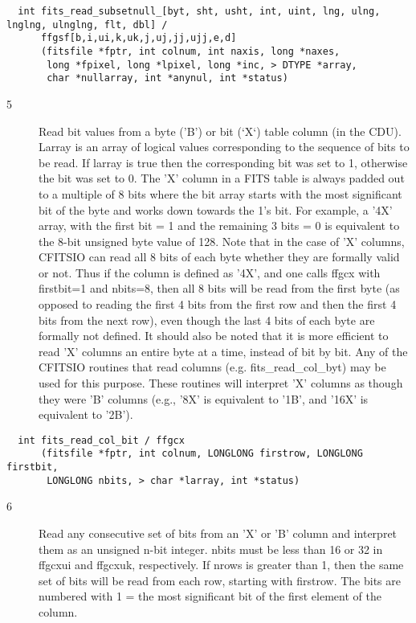 \documentclass[11pt]{book}
\begin{document}
\begin{verbatim}
  int fits_read_subsetnull_[byt, sht, usht, int, uint, lng, ulng, lnglng, ulnglng, flt, dbl] /
      ffgsf[b,i,ui,k,uk,j,uj,jj,ujj,e,d]
      (fitsfile *fptr, int colnum, int naxis, long *naxes,
       long *fpixel, long *lpixel, long *inc, > DTYPE *array,
       char *nullarray, int *anynul, int *status)
\end{verbatim}

\begin{description}
\item[5 ] Read bit values from a byte ('B') or bit (`X`) table column (in the
    CDU).  Larray is an array of logical values corresponding to the
    sequence of bits to be read.  If larray is true then the
    corresponding bit was set to 1, otherwise the bit was set to 0.
    The 'X' column in a FITS table is always padded out to a multiple
    of 8 bits where the bit array starts with the most significant bit
    of the byte and works down towards the 1's bit.  For example, a
    '4X' array, with the first bit = 1 and the remaining 3 bits = 0 is
    equivalent to the 8-bit unsigned byte value of 128.
    Note that in the case of 'X' columns, CFITSIO can read  all 8 bits
    of each byte whether they are formally valid or not.  Thus if the
    column is defined as '4X', and one calls ffgcx with  firstbit=1 and
    nbits=8, then all 8 bits will be read from the first byte (as
    opposed to reading the first 4 bits from the first row and then the
    first 4 bits from the next row), even though the last 4 bits of
    each byte are formally not defined.  It should also be noted that
    it is more efficient to read 'X' columns an entire byte at a time,
    instead of bit by bit.  Any of the CFITSIO routines that read
    columns (e.g. fits\_read\_col\_byt) may be used for this
    purpose.  These routines will interpret 'X' columns as though they
    were 'B' columns (e.g.,  '8X' is equivalent to '1B', and '16X' is
   equivalent to '2B').  \label{ffgcx}
\end{description}

\begin{verbatim}
  int fits_read_col_bit / ffgcx
      (fitsfile *fptr, int colnum, LONGLONG firstrow, LONGLONG firstbit,
       LONGLONG nbits, > char *larray, int *status)
\end{verbatim}

\begin{description}
\item[6 ] Read any consecutive set of bits from an 'X' or 'B' column and
    interpret them as an unsigned n-bit integer.  nbits must be less
    than 16 or 32 in ffgcxui and ffgcxuk, respectively.  If nrows
    is greater than 1, then the same set of bits will be read from
    each row, starting with firstrow. The bits are numbered with
    1 = the most significant bit of the first element of the column.
   \label{ffgcxui}
\end{description}
\end{document}

